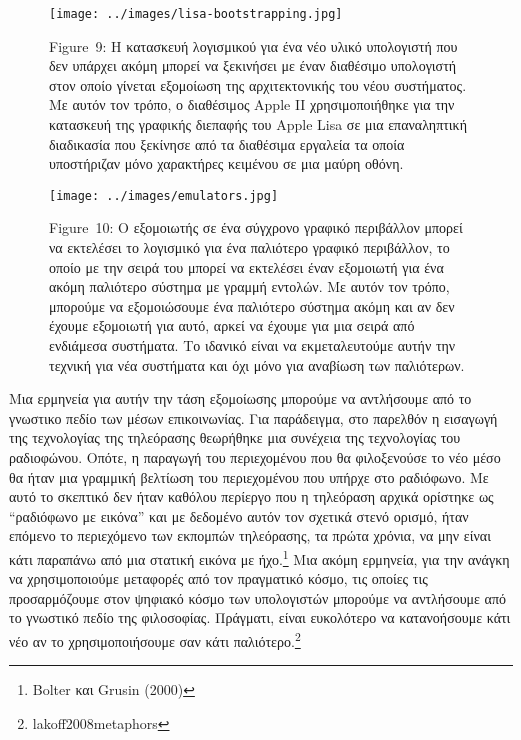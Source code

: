 \documentclass[
]{article}
\begin{document}
\leavevmode{}%
\begin{figure}
\hypertarget{fig:lisa-bootstrapping}{%
\centering
\texttt{[image: ../images/lisa-bootstrapping.jpg]}
\caption{Figure~9: Η κατασκευή λογισμικού για ένα νέο υλικό υπολογιστή
που δεν υπάρχει ακόμη μπορεί να ξεκινήσει με έναν διαθέσιμο υπολογιστή
στον οποίο γίνεται εξομοίωση της αρχιτεκτονικής του νέου συστήματος. Με
αυτόν τον τρόπο, ο διαθέσιμος Apple II χρησιμοποιήθηκε για την κατασκευή
της γραφικής διεπαφής του Apple Lisa σε μια επαναληπτική διαδικασία που
ξεκίνησε από τα διαθέσιμα εργαλεία τα οποία υποστήριζαν μόνο χαρακτήρες
κειμένου σε μια μαύρη οθόνη.}\label{fig:lisa-bootstrapping}
}
\end{figure}

\leavevmode{}%
\begin{figure}
\hypertarget{fig:emulators}{%
\centering
\texttt{[image: ../images/emulators.jpg]}
\caption{Figure~10: Ο εξομοιωτής σε ένα σύγχρονο γραφικό περιβάλλον
μπορεί να εκτελέσει το λογισμικό για ένα παλιότερο γραφικό περιβάλλον,
το οποίο με την σειρά του μπορεί να εκτελέσει έναν εξομοιωτή για ένα
ακόμη παλιότερο σύστημα με γραμμή εντολών. Με αυτόν τον τρόπο, μπορούμε
να εξομοιώσουμε ένα παλιότερο σύστημα ακόμη και αν δεν έχουμε εξομοιωτή
για αυτό, αρκεί να έχουμε για μια σειρά από ενδιάμεσα συστήματα. Το
ιδανικό είναι να εκμεταλευτούμε αυτήν την τεχνική για νέα συστήματα και
όχι μόνο για αναβίωση των παλιότερων.}\label{fig:emulators}
}
\end{figure}

Μια ερμηνεία για αυτήν την τάση εξομοίωσης μπορούμε να αντλήσουμε από το
γνωστικο πεδίο των μέσων επικοινωνίας. Για παράδειγμα, στο παρελθόν η
εισαγωγή της τεχνολογίας της τηλεόρασης θεωρήθηκε μια συνέχεια της
τεχνολογίας του ραδιοφώνου. Οπότε, η παραγωγή του περιεχομένου που θα
φιλοξενούσε το νέο μέσο θα ήταν μια γραμμική βελτίωση του περιεχομένου
που υπήρχε στο ραδιόφωνο. Με αυτό το σκεπτικό δεν ήταν καθόλου περίεργο
που η τηλεόραση αρχικά ορίστηκε ως ``ραδιόφωνο με εικόνα'' και με
δεδομένο αυτόν τον σχετικά στενό ορισμό, ήταν επόμενο το περιεχόμενο των
εκπομπών τηλεόρασης, τα πρώτα χρόνια, να μην είναι κάτι παραπάνω από μια
στατική εικόνα με ήχο.\footnote{Bolter και Grusin (2000)} Μια ακόμη
ερμηνεία, για την ανάγκη να χρησιμοποιούμε μεταφορές από τον πραγματικό
κόσμο, τις οποίες τις προσαρμόζουμε στον ψηφιακό κόσμο των υπολογιστών
μπορούμε να αντλήσουμε από το γνωστικό πεδίο της φιλοσοφίας. Πράγματι,
είναι ευκολότερο να κατανοήσουμε κάτι νέο αν το χρησιμοποιήσουμε σαν
κάτι παλιότερο.\footnote{lakoff2008metaphors}
\end{document}
